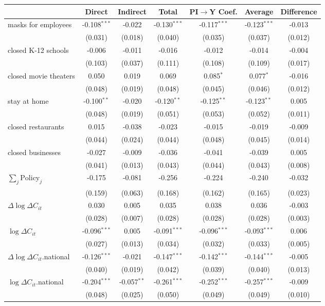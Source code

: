 
\begin{tabular}{lccccc|>{}c}
\toprule
  & Direct & Indirect & Total & PI$\to$Y Coef. & Average & Difference\\
\midrule
masks for employees & -0.108$^{***}$ & -0.022 & -0.130$^{***}$ & -0.117$^{***}$ & -0.123$^{***}$ & -0.013\\
 & (0.031) & (0.018) & (0.040) & (0.035) & (0.037) & (0.012)\\
closed K-12 schools & -0.006 & -0.011 & -0.016 & -0.012 & -0.014 & -0.004\\
 & (0.103) & (0.037) & (0.111) & (0.108) & (0.109) & (0.017)\\
closed movie theaters & 0.050 & 0.019 & 0.069 & 0.085$^{*}$ & 0.077$^{*}$ & -0.016\\
 & (0.048) & (0.019) & (0.048) & (0.045) & (0.046) & (0.012)\\
stay at home & -0.100$^{**}$ & -0.020 & -0.120$^{**}$ & -0.125$^{**}$ & -0.123$^{**}$ & 0.005\\
 & (0.048) & (0.019) & (0.051) & (0.053) & (0.052) & (0.011)\\
closed restaurants & 0.015 & -0.038 & -0.023 & -0.015 & -0.019 & -0.009\\
 & (0.044) & (0.024) & (0.044) & (0.048) & (0.045) & (0.014)\\
closed businesses & -0.027 & -0.009 & -0.036 & -0.041 & -0.039 & 0.005\\
 & (0.041) & (0.013) & (0.043) & (0.044) & (0.043) & (0.008)\\
$\sum_j \mathrm{Policy}_j$ & -0.175 & -0.081 & -0.256 & -0.224 & -0.240 & -0.032\\
 & (0.159) & (0.063) & (0.168) & (0.162) & (0.165) & (0.023)\\
$\Delta \log \Delta C_{it}$ & 0.030 & 0.005 & 0.035 & 0.038 & 0.036 & -0.003\\
 & (0.028) & (0.007) & (0.028) & (0.028) & (0.028) & (0.003)\\
$\log \Delta C_{it}$ & -0.096$^{***}$ & 0.005 & -0.091$^{***}$ & -0.096$^{***}$ & -0.093$^{***}$ & 0.006\\
 & (0.027) & (0.013) & (0.034) & (0.032) & (0.033) & (0.005)\\
$\Delta \log \Delta C_{it}$.national & -0.126$^{***}$ & -0.021 & -0.147$^{***}$ & -0.142$^{***}$ & -0.144$^{***}$ & -0.005\\
 & (0.040) & (0.019) & (0.042) & (0.039) & (0.040) & (0.013)\\
$\log \Delta C_{it}$.national & -0.204$^{***}$ & -0.057$^{**}$ & -0.261$^{***}$ & -0.252$^{***}$ & -0.257$^{***}$ & -0.009\\
 & (0.048) & (0.025) & (0.050) & (0.049) & (0.049) & (0.010)\\
\bottomrule
\end{tabular}